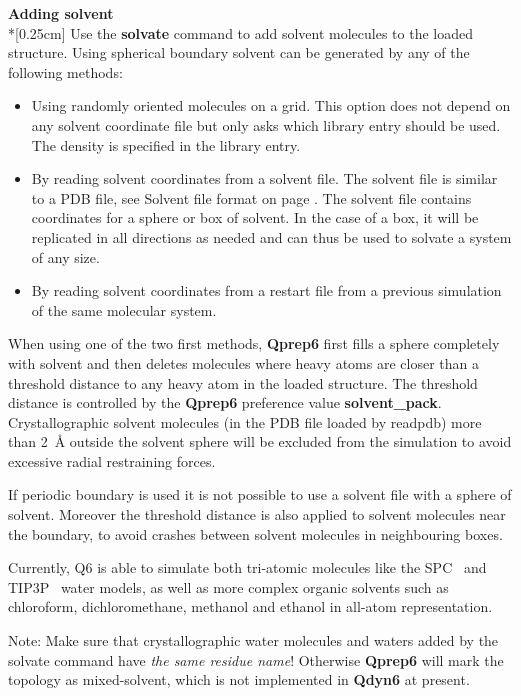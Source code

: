 \documentclass[a4paper,11pt]{article}
\let\origcite\cite
\def\cite#1{\unskip~\origcite{#1}}
\begin{document}
\textbf{Adding solvent}\\*[0.25cm] Use the \textbf{solvate}
command to add solvent molecules to the loaded structure. Using
spherical boundary solvent can be generated by any of the
following methods:

\begin{itemize}
\item Using randomly oriented molecules on a grid. This option does not depend
on any solvent coordinate file but only asks which library entry
should be used. The density is specified in the library entry.
\item By reading solvent coordinates from a solvent file. The solvent file is
similar to a PDB file, see Solvent file format on page
\pageref{subsubsec:solvent_file_format}. The solvent file contains
coordinates for a sphere or box of solvent. In the case of a box,
it will be replicated in all directions as needed and can thus be
used to solvate a system of any size.
\item By reading solvent coordinates from a restart file from a previous
simulation of the same molecular system.
\end{itemize}

When using one of the two first methods, \textbf{Qprep6} first fills a
sphere completely with solvent and then deletes molecules where
heavy atoms are closer than a threshold distance to any heavy atom
in the loaded structure. The threshold distance is controlled by
the \textbf{Qprep6} preference value \textbf{solvent{\_}pack}.
Crystallographic solvent molecules (in the PDB file loaded by
readpdb) more than 2~{\AA} outside the solvent sphere will be
excluded from the simulation to avoid excessive radial restraining
forces.

If periodic boundary is used it is not possible to use a solvent
file with a sphere of solvent. Moreover the threshold distance is
also applied to solvent molecules near the boundary, to avoid
crashes between solvent molecules in neighbouring boxes.

Currently, Q6 is able to simulate both tri-atomic
molecules like the SPC\cite{berendsenintermolecular} and
TIP3P\cite{Jorgensen1983b} water models, as well as
more complex organic solvents such as chloroform, dichloromethane,
methanol and ethanol in all-atom representation.

Note: Make sure that crystallographic water molecules and waters
added by the solvate command have \textit{the same residue name}!
Otherwise \textbf{Qprep6} will mark the topology as mixed-solvent, which is
not implemented in \textbf{Qdyn6} at present.
\end{document}
